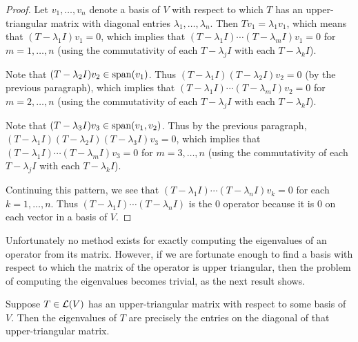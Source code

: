 \begin{proof}
Let $v_1,\dots,v_n$ denote a basis of $V$ with respect to which $T$ has an
upper-triangular matrix with diagonal entries $\lambda_1,\dots,\lambda_n$. Then
$Tv_1=\lambda_1v_1$, which means that $(T-\lambda_1I)v_1=0$, which implies that
$(T-\lambda_1I)\cdots(T-\lambda_mI)v_1=0$ for $m=1,\dots,n$ (using the
commutativity of each $T-\lambda_jI$ with each $T-\lambda_kI$).

Note that $(T-\lambda_2I)v_2\in\operatorname{span}(v_1)$. Thus
$(T-\lambda_1I)(T-\lambda_2I)v_2=0$ (by the previous paragraph), which implies
that $(T-\lambda_1I)\cdots(T-\lambda_mI)v_2=0$ for $m=2,\dots,n$ (using the
commutativity of each $T-\lambda_jI$ with each $T-\lambda_kI$).

Note that $(T-\lambda_3I)v_3\in\operatorname{span}(v_1,v_2)$. Thus by the previous paragraph,
$(T-\lambda_1I)(T-\lambda_2I)(T-\lambda_3I)v_3=0$, which implies that
$(T-\lambda_1I)\cdots(T-\lambda_mI)v_3=0$ for $m=3,\dots,n$ (using the
commutativity of each $T-\lambda_jI$ with each $T-\lambda_kI$).

Continuing this pattern, we see that $(T-\lambda_1I)\cdots(T-\lambda_nI)v_k=0$
for each $k=1,\dots,n$. Thus $(T-\lambda_1I)\cdots(T-\lambda_nI)$ is the $0$
operator because it is $0$ on each vector in a basis of $V$.
\end{proof}

Unfortunately no method exists for exactly computing the eigenvalues of an
operator from its matrix. However, if we are fortunate enough to find a basis with
respect to which the matrix of the operator is upper triangular, then the problem
of computing the eigenvalues becomes trivial, as the next result shows.

\begin{result}%
\label{ax:5.41}
Suppose $T\in\mathcal{L}(V)$ has an upper-triangular matrix with respect to some basis
of $V$. Then the eigenvalues of $T$ are precisely the entries on the diagonal of
that upper-triangular matrix.
\end{result}

